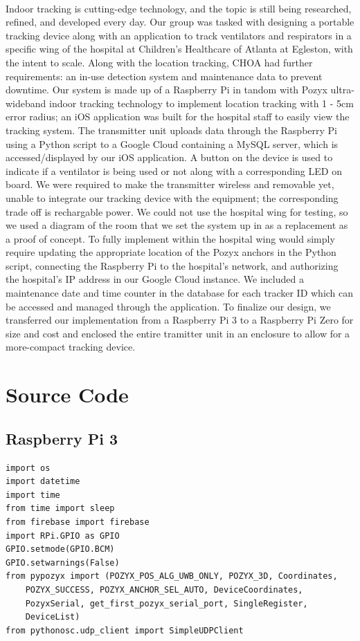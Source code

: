 \documentclass[12pt]{article}
\begin{document}
	\paragraph*{}
		Indoor tracking is cutting-edge technology, and the topic is still being researched, refined, and developed every day. Our group was tasked with designing a portable tracking device along with an application to track ventilators and respirators in a specific wing of the hospital at Children’s Healthcare of Atlanta at Egleston, with the intent to scale. Along with the location tracking, CHOA had further requirements: an in-use detection system and maintenance data to prevent downtime. Our system is made up of a Raspberry Pi in tandom with Pozyx ultra-wideband indoor tracking technology to implement location tracking with 1 - 5cm error radius; an iOS application was built for the hospital staff to easily view the tracking system. The transmitter unit uploads data through the Raspberry Pi using a Python script to a Google Cloud containing a MySQL server, which is accessed/displayed by our iOS application. A button on the device is used to indicate if a ventilator is being used or not along with a corresponding LED on board. We were required to make the transmitter wireless and removable yet, unable to integrate our tracking device with the equipment; the corresponding trade off is rechargable power. We could not use the hospital wing for testing, so we used a diagram of the room that we set the system up in as a replacement as a proof of concept. To fully implement within the hospital wing would simply require updating the appropriate location of the Pozyx anchors in the Python script, connecting the Raspberry Pi to the hospital’s network, and authorizing the hospital’s IP address in our Google Cloud instance. We included a maintenance date and time counter in the database for each tracker ID which can be accessed and managed through the application. To finalize our design, we transferred our implementation from a Raspberry Pi 3 to a Raspberry Pi Zero for size and cost and enclosed the entire tramitter unit in an enclosure to allow for a more-compact tracking device.

\section{Source Code}
	\subsection{Raspberry Pi 3}
		\begin{Verbatim}[fontsize=\small]
import os
import datetime
import time
from time import sleep
from firebase import firebase
import RPi.GPIO as GPIO
GPIO.setmode(GPIO.BCM)
GPIO.setwarnings(False)
from pypozyx import (POZYX_POS_ALG_UWB_ONLY, POZYX_3D, Coordinates, 
	POZYX_SUCCESS, POZYX_ANCHOR_SEL_AUTO, DeviceCoordinates,
	PozyxSerial, get_first_pozyx_serial_port, SingleRegister,
	DeviceList)
from pythonosc.udp_client import SimpleUDPClient
		\end{Verbatim}
\end{document}
